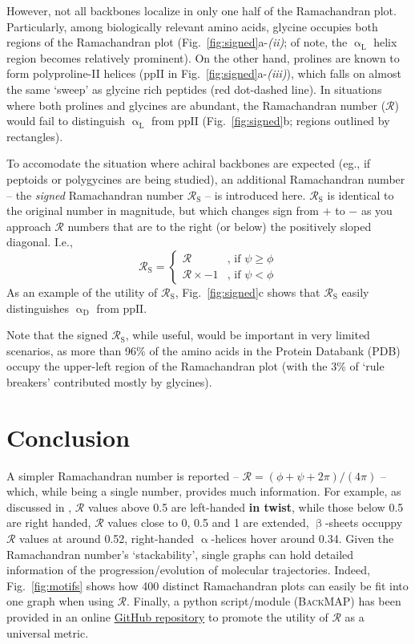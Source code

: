 \documentclass[fleqn,10pt,lineno]{wlpeerj} %
\newcommand{\Fig}[1]{Fig.~\ref{#1}}
\newcommand{\n}[1]{{\textbf{\color{red}#1}}}
\newcommand{\gname}{BackMAP}
\newcommand{\pname}{\textsc{\gname}\xspace}
\newcommand{\rr}{$\mathcal{R}$\xspace}
\begin{document}
However, not all backbones localize in only one half of the Ramachandran plot. Particularly, among biologically relevant amino acids, glycine occupies both regions of the Ramachandran plot (\Fig{fig:signed}a-{\it(ii)}; of note, the $\upalpha_\textrm{L}$ helix region becomes relatively prominent). On the other hand, prolines are known to form polyproline-II helices ($\textrm{ppII}$ in \Fig{fig:signed}a-{\it(iii)}), which falls on almost the same `sweep' as glycine rich peptides (red dot-dashed line). In situations where both prolines and glycines are abundant, the Ramachandran number (\rr) would fail to distinguish $\upalpha_\textrm{L}$ from $\textrm{ppII}$ (\Fig{fig:signed}b; regions outlined by rectangles).


To accomodate the situation where achiral backbones are expected (eg., if peptoids or polygycines are being studied), an additional Ramachandran number -- the \textit{signed} Ramachandran number $\mathcal{R}_\textrm{S}$ -- is introduced here. $\mathcal{R}_\textrm{S}$ is identical to the original number in magnitude, but which changes sign from $+$ to $-$ as you approach $\mathcal{R}$ numbers that are to the right (or below) the positively sloped diagonal. I.e., 
\begin{equation}
\mathcal{R}_\textrm{S} = 
\begin{cases}
    \mathcal{R}         &\text{, if } \psi \geq \phi  \\
    \mathcal{R}\times-1 &\text{, if } \psi   <  \phi
\end{cases}\label{eqn:signed}
\end{equation}
As an example of the utility of $\mathcal{R}_\textrm{S}$, \Fig{fig:signed}c shows that $\mathcal{R}_\textrm{S}$ easily distinguishes $\upalpha_\textrm{D}$ from $\textrm{ppII}$.

Note that the signed $\mathcal{R}_\textrm{S}$, while useful, would be important in very limited scenarios, as more than 96\% of the amino acids in the Protein Databank (PDB) occupy the upper-left region of the Ramachandran plot (with the 3\% of `rule breakers' contributed mostly by glycines).

\section*{Conclusion}

A simpler Ramachandran number is reported -- $\mathcal{R} = (\phi+\psi+2\pi)/(4\pi)$ -- which, while being a single number, provides much information. For example, as discussed in \cite{Mannige2016}, \rr values above 0.5 are left-handed \n{in twist}, while those below 0.5 are right handed, \rr values close to 0, 0.5 and 1 are extended, $\upbeta$-sheets occuppy \rr values at around 0.52, right-handed $\upalpha$-helices hover around 0.34. Given the Ramachandran number's `stackability', single graphs can hold detailed information of the progression/evolution of molecular trajectories. Indeed, \Fig{fig:motifs} shows how 400 distinct Ramachandran plots can easily be fit into one graph when using \rr. Finally, a python script/module (\pname) has been provided in an online \href{https://github.com/ranjanmannige/\gname}{GitHub repository} to promote the utility of \rr as a universal metric.
\end{document}
